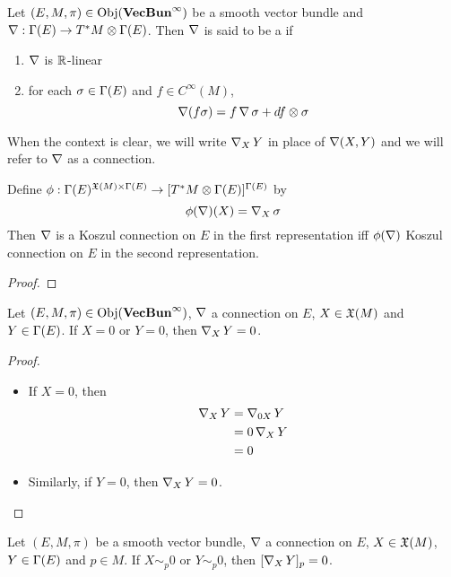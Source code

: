 \documentclass{book}
\begin{document}
	\begin{defn}
		Let $(E, M, \pi) \in \operatorname{Obj}(\operatorname*{\text{\textbf{VecBun}}^{\infty}})$ be a smooth vector bundle and $\operatorname{\nabla} : \Gamma(E) \rightarrow T^*M \otimes \Gamma(E)$. Then $\operatorname{\nabla}$ is said to be a  if 
		\begin{enumerate}
			\item $\operatorname{\nabla}$ is $\mathbb{R}$-linear
			\item for each $\sigma \in \Gamma(E)$ and $f \in C^{\infty}(M)$, 
			$$\operatorname{\nabla}(f\sigma) = f \operatorname{\nabla} \sigma + df \otimes \sigma $$ 
		\end{enumerate}
	\end{defn}

	\begin{note}
		When the context is clear, we will write $\operatorname{\nabla}_X Y$ in place of $\operatorname{\nabla}(X,Y)$ and we will refer to $\operatorname{\nabla}$ as a connection.
	\end{note}

	\begin{ex}
		Define $\phi:  \Gamma(E)^{\mathfrak{X}(M) \times \Gamma(E)} \rightarrow [T^*M \otimes \Gamma(E)]^{\Gamma(E)}$ by 
		$$\phi(\operatorname{\nabla})(X) = \operatorname{\nabla}_X \sigma$$
		Then $\operatorname{\nabla}$ is a Koszul connection on $E$ in the first representation iff $\phi(\operatorname{\nabla})$ Koszul connection on $E$ in the second representation.
	\end{ex}

	\begin{proof}
		
	\end{proof}

	\begin{ex}
		Let $(E, M, \pi) \in \operatorname{Obj}(\operatorname*{\text{\textbf{VecBun}}^{\infty}})$, $\operatorname{\nabla}$ a connection on $E$, $X \in \mathfrak{X}(M)$ and $Y \in \Gamma(E)$. If $X = 0$ or $Y = 0$, then $\operatorname{\nabla}_X Y = 0$.
	\end{ex}

	\begin{proof}\
		\begin{itemize}
			\item If $X = 0$, then 
			\begin{align*}
				\operatorname{\nabla}_X Y
				& = \operatorname{\nabla}_{0 X} Y \\
				& = 0 \operatorname{\nabla}_X Y \\
				& = 0
			\end{align*}
			\item Similarly, if $Y = 0$, then $\operatorname{\nabla}_X Y = 0$.
		\end{itemize}
	\end{proof}

	\begin{ex}
		Let $(E, M, \pi)$ be a smooth vector bundle, $\operatorname{\nabla}$ a connection on $E$, $X \in \mathfrak{X}(M)$, $Y \in \Gamma(E)$ and $p \in M$. If $X \sim_p 0$ or $Y \sim_p 0$, then $[\operatorname{\nabla}_{X}Y]_p = 0$.
	\end{ex}
\end{document}
